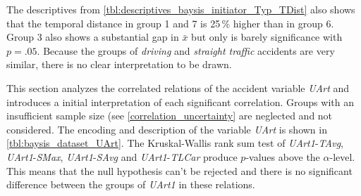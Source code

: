 The descriptives from \cref{tbl:descriptives_baysis_initiator_Typ_TDist} also shows that the temporal distance in group 1 and 7 is 25\,\% higher than in group 6. Group 3 also shows a substantial gap in $\bar{x}$ but only is barely significance with $p=.05$. Because the groups of \textit{driving} and \textit{straight traffic} accidents are very similar, there is no clear interpretation to be drawn.

This section analyzes the correlated relations of the accident variable \textit{UArt} and introduces a initial interpretation of each significant correlation. Groups with an insufficient sample size (see \cref{correlation_uncertainty} are neglected and not considered. The encoding and description of the variable \textit{UArt} is shown in \cref{tbl:baysis_dataset_UArt}. The Kruskal-Wallis rank sum test of \textit{UArt1}-\textit{TAvg}, \textit{UArt1}-\textit{SMax}, \textit{UArt1}-\textit{SAvg} and \textit{UArt1}-\textit{TLCar} produce $p$-values above the $\alpha$-level. This means that the null hypothesis can't be rejected and there is no significant difference between the groups of \textit{UArt1} in these relations. 

